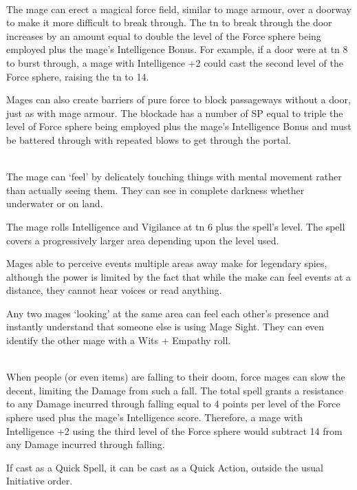 \begin{multicols}{2}
\\
The mage can erect a magical force field, similar to mage armour, over a doorway to make it more difficult to break through.
The \gls{tn} to break through the door increases by an amount equal to double the level of the Force sphere being employed plus the mage's Intelligence Bonus.
For example, if a door were at \gls{tn} 8 to burst through, a mage with Intelligence +2 could cast the second level of the Force sphere, raising the \gls{tn} to 14.

Mages can also create barriers of pure force to block passageways without a door, just as with mage armour.
The blockade has a number of \gls{SP} equal to triple the level of Force sphere being employed plus the mage's Intelligence Bonus and must be battered through with repeated blows to get through the portal.

\\
The mage can `feel' by delicately touching things with mental movement rather than actually seeing them. They can see in complete darkness whether underwater or on land.

The mage rolls Intelligence and Vigilance at \gls{tn} 6 plus the spell's level.
The spell covers a progressively larger area depending upon the level used.

Mages able to perceive events multiple areas away make for legendary spies, although the power is limited by the fact that while the make can feel events at a distance, they cannot hear voices or read anything.

Any two mages `looking' at the same area can feel each other's presence and instantly understand that someone else is using Mage Sight.
They can even identify the other mage with a Wits + Empathy roll.

\\
When people (or even items) are falling to their doom, force mages can slow the decent, limiting the Damage from such a fall.
The total spell grants a resistance to any Damage incurred through falling equal to 4 points per level of the Force sphere used plus the mage's Intelligence score.
Therefore, a mage with Intelligence +2 using the third level of the Force sphere would subtract 14 from any Damage incurred through falling.

If cast as a Quick Spell, it can be cast as a Quick Action, outside the usual Initiative order.


\end{multicols}
